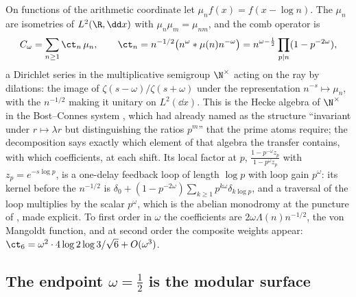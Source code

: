 On functions of the arithmetic coordinate let $\mu_nf(x)=f(x-\log n)$. The
$\mu_n$ are isometries of $L^2(\R,\dd x)$ with $\mu_n\mu_m=\mu_{nm}$, and the
comb operator is
\begin{equation}\label{eq:heckeop}
 C_\omega=\sum_{n\geq1}\ct_n\,\mu_n,\qquad
 \ct_n=n^{-1/2}\big(n^{\omega}*\mu(n)n^{-\omega}\big)=n^{\omega-\frac12}\prod_{p\mid n}(1-p^{-2\omega}),
\end{equation}
a Dirichlet series in the multiplicative semigroup $\N^\times$ acting on the
ray by dilations: the image of $\zeta(s-\omega)/\zeta(s+\omega)$ under the
representation $n^{-s}\mapsto\mu_n$, with the $n^{-1/2}$ making it unitary on
$L^2(\dd x)$. This is the Hecke algebra of $\N^\times$ in the Bost--Connes
system \cite{BostConnes}, which \cite[Section~10.4]{WilsonLines} had already
named as the structure ``invariant under $r\mapsto\lambda r$ but distinguishing
the ratios $p^m$'' that the prime atoms require; the decomposition says exactly
which element of that algebra the transfer contains, with which coefficients,
at each shift. Its local factor at $p$, $\frac{1-p^{-\omega}z_p}{1-p^{\omega}z_p}$
with $z_p=e^{-s\log p}$, is a one-delay feedback loop of length $\log p$ with
loop gain $p^{\omega}$: its kernel before the $n^{-1/2}$ is
$\delta_0+(1-p^{-2\omega})\sum_{k\geq1}p^{k\omega}\delta_{k\log p}$, and a
traversal of the loop multiplies by the scalar $p^\omega$, which is the abelian
monodromy at the puncture of \cite[Section~9.4]{WilsonLines}, made explicit.
To first order in $\omega$ the coefficients are $2\omega\Lambda(n)n^{-1/2}$,
the von Mangoldt function, and at second order the composite weights appear:
$\ct_6=\omega^2\cdot4\log2\log3/\sqrt6+O(\omega^3)$.

\subsection{The endpoint \texorpdfstring{$\omega=\frac12$}{omega = 1/2} is the modular surface}\label{sec:endpoint}

